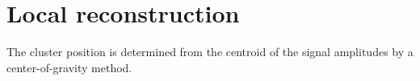 \section{Local reconstruction}

The cluster position is determined from the centroid of the signal amplitudes by a center-of-gravity method. 